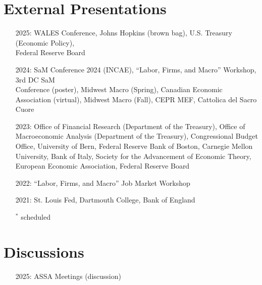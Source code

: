 \documentclass[margin,line]{res}                          %
\newenvironment{list1}{
	\begin{list}{\ding{113}}{%
			\setlength{\itemsep}{0in}
			\setlength{\parsep}{0in} \setlength{\parskip}{0in}
			\setlength{\topsep}{0in} \setlength{\partopsep}{0in}
			\setlength{\leftmargin}{0.17in}}}{\end{list}}
\begin{document}
\begin{resume}
	\section{\sc External Presentations}
	\begin{list1}
		\item[]
		\begin{itemize}\setlength{\itemindent}{.3cm}
			\item[2025:]\makebox[0.1cm]{\hfill} WALES Conference, Johns Hopkins (brown bag), U.S. Treasury (Economic Policy),\\ 
			\hspace*{0.55cm}Federal Reserve Board \smallskip
			\item[2024:]\makebox[0.1cm]{\hfill} SaM Conference 2024 (INCAE), ``Labor, Firms, and Macro'' Workshop, 3rd DC SaM\\ 
			\hspace*{0.55cm}Conference (poster), Midwest Macro (Spring), Canadian Economic Association (virtual),
			\hspace*{0.55cm}Midwest Macro (Fall), CEPR MEF, Cattolica del Sacro Cuore\smallskip
			\item[2023:]\makebox[0.1cm]{\hfill} Office of Financial Research (Department of the Treasury), Office of Macroeconomic \hspace*{0.55cm}Analysis (Department of the Treasury), Congressional Budget Office, University of Bern, \hspace*{0.55cm}Federal Reserve Bank of Boston, Carnegie Mellon University, Bank of Italy,  Society \hspace*{0.55cm}for the Advancement of Economic Theory, European Economic Association, Federal
			\hspace*{0.55cm}Reserve Board\smallskip
			\item[2022:]\makebox[0.1cm]{\hfill} ``Labor, Firms, and Macro'' Job Market Workshop \smallskip
			\item[2021:]\makebox[0.1cm]{\hfill} St. Louis Fed, Dartmouth College, Bank of England\\
			\item[]\makebox[-1cm]{\hfill} $^\ast$ scheduled
		\end{itemize}		
	\end{list1}
	
	\section{\sc Discussions}
	\begin{list1}
		\item[]
		\begin{itemize}\setlength{\itemindent}{.3cm}
			\item[2025:]\makebox[0.1cm]{\hfill} ASSA Meetings (discussion)
		\end{itemize}		
	\end{list1}
	

\end{resume}
\end{document}
